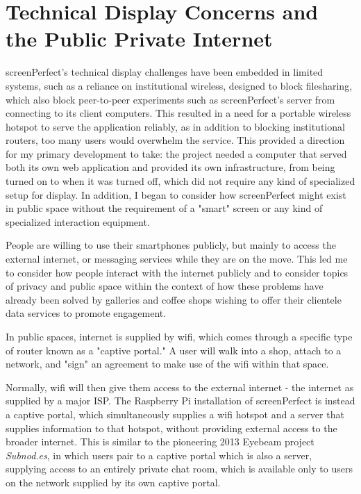 \section{Technical Display Concerns and the Public Private Internet}
screenPerfect's technical display challenges have been embedded in limited systems, such as a reliance on institutional wireless, designed to block filesharing, which also block peer-to-peer experiments such as screenPerfect's server from connecting to its client computers. This resulted in a need for a portable wireless hotspot to serve the application reliably, as in addition to blocking institutional routers, too many users would overwhelm the service. This provided a direction for my primary development to take: the project needed a computer that served both its own web application and provided its own infrastructure, from being turned on to when it was turned off, which did not require any kind of specialized setup for display. In addition, I began to consider how screenPerfect might exist in public space without the requirement of a "smart" screen or any kind of specialized interaction equipment.

People are willing to use their smartphones publicly, but mainly to access the external internet, or messaging services while they are on the move. This led me to consider how people interact with the internet publicly and to consider topics of privacy and public space within the context of how these problems have already been solved by galleries and coffee shops wishing to offer their clientele data services to promote engagement.

In public spaces, internet is supplied by wifi, which comes through a specific type of router known as a "captive portal." A user will walk into a shop, attach to a network, and "sign" an agreement to make use of the wifi within that space. 

Normally, wifi will then give them access to the external internet - the internet as supplied by a major ISP. 
The Raspberry Pi installation of screenPerfect is instead a captive portal, which simultaneously supplies a wifi hotspot and a server that supplies information to that hotspot, without providing external access to the broader internet. This is similar to the pioneering 2013 Eyebeam project \textit{Subnod.es}, in which users pair to a captive portal which is also a server, supplying access to an entirely private chat room, which is available only to users on the network supplied by its own captive portal. 

